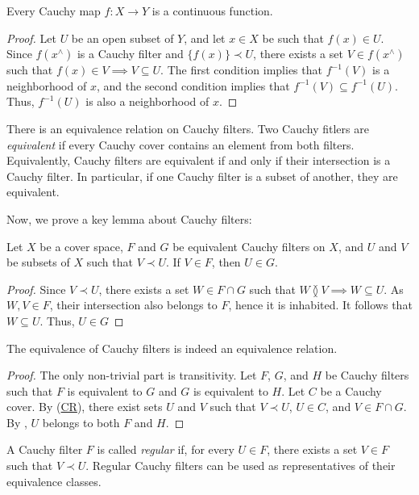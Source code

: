 \documentclass[pdflatex,sn-mathphys-num]{sn-jnl}
\newcommand{\axref}[1]{(\hyperref[ax:#1]{#1})}
\theoremstyle{definition}
\theoremstyle{remark}
\numberwithin{figure}{section}
\newcommand{\overlap}[2]{#1 \between #2}
\newcommand{\rb}{\prec}
\begin{document}
\begin{prop}
Every Cauchy map $f : X \to Y$ is a continuous function.
\end{prop}
\begin{proof}
Let $U$ be an open subset of $Y$, and let $x \in X$ be such that $f(x) \in U$.
Since $f(x^\wedge)$ is a Cauchy filter and $\{ f(x) \} \rb U$, there exists a set $V \in f(x^\wedge)$ such that $f(x) \in V \implies V \subseteq U$.
The first condition implies that $f^{-1}(V)$ is a neighborhood of $x$, and the second condition implies that $f^{-1}(V) \subseteq f^{-1}(U)$.
Thus, $f^{-1}(U)$ is also a neighborhood of $x$.
\end{proof}

There is an equivalence relation on Cauchy filters.
Two Cauchy fitlers are \emph{equivalent} if every Cauchy cover contains an element from both filters.
Equivalently, Cauchy filters are equivalent if and only if their intersection is a Cauchy filter.
In particular, if one Cauchy filter is a subset of another, they are equivalent.

Now, we prove a key lemma about Cauchy filters:

\begin{lem}
Let $X$ be a cover space, $F$ and $G$ be equivalent Cauchy filters on $X$, and $U$ and $V$ be subsets of $X$ such that $V \rb U$.
If $V \in F$, then $U \in G$.
\end{lem}
\begin{proof}
Since $V \rb U$, there exists a set $W \in F \cap G$ such that $\overlap{W}{V} \implies W \subseteq U$.
As $W,V \in F$, their intersection also belongs to $F$, hence it is inhabited.
It follows that $W \subseteq U$.
Thus, $U \in G$
\end{proof}

\begin{prop}
The equivalence of Cauchy filters is indeed an equivalence relation.
\end{prop}
\begin{proof}
The only non-trivial part is transitivity.
Let $F$, $G$, and $H$ be Cauchy filters such that $F$ is equivalent to $G$ and $G$ is equivalent to $H$.
Let $C$ be a Cauchy cover.
By \axref{CR}, there exist sets $U$ and $V$ such that $V \rb U$, $U \in C$, and $V \in F \cap G$.
By , $U$ belongs to both $F$ and $H$.
\end{proof}

A Cauchy filter $F$ is called \emph{regular} if, for every $U \in F$, there exists a set $V \in F$ such that $V \rb U$.
Regular Cauchy filters can be used as representatives of their equivalence classes.
\end{document}
